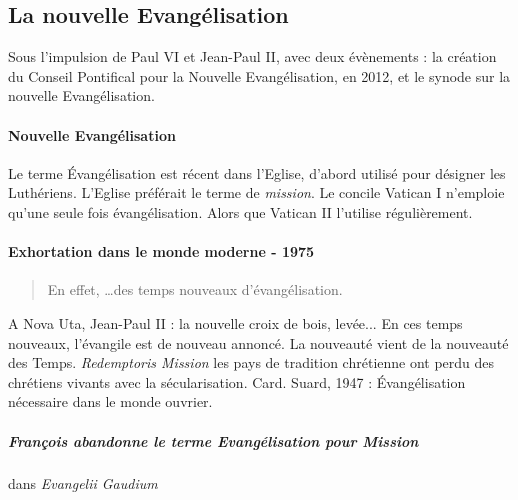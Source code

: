 \subsection{La nouvelle Evangélisation} 
Sous l'impulsion de Paul VI et Jean-Paul II, avec deux évènements : la création du Conseil Pontifical pour la Nouvelle Evangélisation, en 2012, et le synode sur la nouvelle Evangélisation.

\paragraph{Nouvelle Evangélisation} Le terme Évangélisation est récent dans l'Eglise, d'abord utilisé pour désigner les Luthériens. L'Eglise préférait le terme de \textit{mission}. Le concile Vatican I n'emploie qu'une seule fois évangélisation. Alors que Vatican II l'utilise régulièrement.

\paragraph{Exhortation dans le monde moderne - 1975} 
\begin{quote}
En effet, \ldots des temps nouveaux d'évangélisation.
\end{quote}

A Nova Uta, Jean-Paul II : la nouvelle croix de bois, levée... En ces temps nouveaux, l'évangile est de nouveau annoncé. La nouveauté vient de la nouveauté des Temps.
\textit{Redemptoris Mission} les pays de tradition chrétienne ont perdu des chrétiens vivants avec la sécularisation. Card. Suard, 1947 : Évangélisation nécessaire dans le monde ouvrier.


\subparagraph{François abandonne le terme Evangélisation pour Mission} dans \textit{Evangelii Gaudium}

